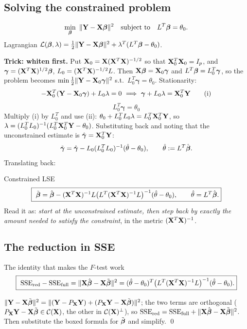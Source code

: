 \documentclass[11pt]{article}
\begin{document}
\subsection{Solving the constrained problem}

\[
  \min_{\boldsymbol{\beta}}\ \|\mathbf{Y}-\mathbf{X}\boldsymbol{\beta}\|^2 \quad\text{subject to}\quad L^T\boldsymbol{\beta}=\theta_0 .
\]
Lagrangian $\mathcal{L}(\boldsymbol{\beta},\lambda)=\tfrac12\|\mathbf{Y}-\mathbf{X}\boldsymbol{\beta}\|^2+\lambda^T(L^T\boldsymbol{\beta}-\theta_0)$.

\textbf{Trick: whiten first.} Put $\mathbf{X}_0=\mathbf{X}(\mathbf{X}^T\mathbf{X})^{-1/2}$ so that $\mathbf{X}_0^T\mathbf{X}_0=I_p$,
and $\boldsymbol\gamma=(\mathbf{X}^T\mathbf{X})^{1/2}\boldsymbol{\beta}$, $L_0=(\mathbf{X}^T\mathbf{X})^{-1/2}L$. Then
$\mathbf{X}\boldsymbol{\beta}=\mathbf{X}_0\boldsymbol\gamma$ and $L^T\boldsymbol{\beta}=L_0^T\boldsymbol\gamma$, so the problem becomes
$\min\tfrac12\|\mathbf{Y}-\mathbf{X}_0\boldsymbol\gamma\|^2$ s.t.\ $L_0^T\boldsymbol\gamma=\theta_0$.
Stationarity:
\[
  -\mathbf{X}_0^T(\mathbf{Y}-\mathbf{X}_0\boldsymbol\gamma)+L_0\lambda=0
  \ \Longrightarrow\ \boldsymbol\gamma+L_0\lambda=\mathbf{X}_0^T\mathbf{Y} \tag{i}
\]
\[
  L_0^T\boldsymbol\gamma=\theta_0 \tag{ii}
\]
Multiply (i) by $L_0^T$ and use (ii): $\theta_0+L_0^TL_0\lambda=L_0^T\mathbf{X}_0^T\mathbf{Y}$, so
$\lambda=(L_0^TL_0)^{-1}(L_0^T\mathbf{X}_0^T\mathbf{Y}-\theta_0)$. Substituting back and noting that the
unconstrained estimate is $\hat{\boldsymbol\gamma}=\mathbf{X}_0^T\mathbf{Y}$:
\[
  \tilde{\boldsymbol\gamma}=\hat{\boldsymbol\gamma}-L_0(L_0^TL_0)^{-1}(\hat\theta-\theta_0),
  \qquad \hat\theta:=L^T\hat{\boldsymbol{\beta}} .
\]
Translating back:

\begin{recipe}{Constrained LSE}
\[
  \boxed{\ \tilde\bb=\hat\bb-(\bX^T\bX)^{-1}L\big(L^T(\bX^T\bX)^{-1}L\big)^{-1}(\hat\theta-\theta_0),
  \qquad \hat\theta=L^T\hat\bb .}
\]
Read it as: \emph{start at the unconstrained estimate, then step back by exactly the amount
needed to satisfy the constraint}, in the metric $(\mathbf{X}^T\mathbf{X})^{-1}$.
\end{recipe}

\subsection{The reduction in SSE}

\begin{idea}{The identity that makes the $F$-test work}
\[
  \boxed{\ \mathrm{SSE}_{\text{red}}-\mathrm{SSE}_{\text{full}}
  =\|\bX\hat\bb-\bX\tilde\bb\|^2
  =(\hat\theta-\theta_0)^T\big(L^T(\bX^T\bX)^{-1}L\big)^{-1}(\hat\theta-\theta_0) . }
\]
\end{idea}
\prf $\|\mathbf{Y}-\mathbf{X}\tilde{\boldsymbol{\beta}}\|^2=\|(\mathbf{Y}-P_{\mathbf{X}}\mathbf{Y})+(P_{\mathbf{X}}\mathbf{Y}-\mathbf{X}\tilde{\boldsymbol{\beta}})\|^2$; the two terms are
orthogonal ($P_{\mathbf{X}}\mathbf{Y}-\mathbf{X}\tilde{\boldsymbol{\beta}}\in\mathcal{C}(\mathbf{X})$, the other in $\mathcal{C}(\mathbf{X})^\perp$), so
$\mathrm{SSE}_{\text{red}}=\mathrm{SSE}_{\text{full}}+\|\mathbf{X}\hat{\boldsymbol{\beta}}-\mathbf{X}\tilde{\boldsymbol{\beta}}\|^2$. Then
substitute the boxed formula for $\tilde{\boldsymbol{\beta}}$ and simplify. \qed
\end{document}
